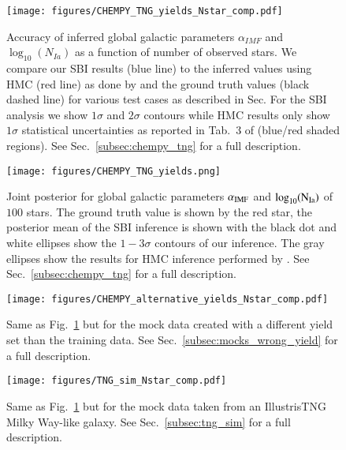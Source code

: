\documentclass{aa}
\begin{document}
\begin{figure*}
    \centering
    \texttt{[image: figures/CHEMPY\_TNG\_yields\_Nstar\_comp.pdf]}
    \vspace{-.5cm}
    \caption{Accuracy of inferred global galactic parameters $\alpha_{IMF}$ and $\log_{10}(N_{Ia})$ as a function of number of observed stars. We compare our SBI results (blue line) to the inferred values using HMC (red line) as done by \cite{Philcox_2019} and the ground truth values (black dashed line) for various test cases as described in Sec. For the SBI analysis we show $1\sigma$ and $2\sigma$ contours while HMC results only show $1\sigma$ statistical uncertainties as reported in Tab.~3 of \citet{Philcox_2019} (blue/red shaded regions). See Sec.~\ref{subsec:chempy_tng} for a full description.}
    \label{fig:CHEMPY_TNG_N_star_analysis}
\end{figure*}

\begin{figure}
    \centering
    \texttt{[image: figures/CHEMPY\_TNG\_yields.png]}
    \vspace{-.25cm}
    \caption{Joint posterior for global galactic parameters $\alpha_{\rm IMF}$ and $\log_{10}(\rm N_{Ia})$ of $100$ stars. The ground truth value is shown by the red star, the posterior mean of the SBI inference is shown with the black dot and white ellipses show the $1-3\sigma$ contours of our inference. The gray ellipses show the results for HMC inference performed by \citet{Philcox_2019}. See Sec.~\ref{subsec:chempy_tng} for a full description.}
    \label{fig:CHEMPY_TNG_sbi} 
\end{figure}
\begin{figure*}
    \centering
    \texttt{[image: figures/CHEMPY\_alternative\_yields\_Nstar\_comp.pdf]}
    \vspace{-.5cm}
    \caption{Same as Fig.~\ref{fig:CHEMPY_TNG_N_star_analysis} but for the mock data created with a different yield set than the training data. See Sec.~\ref{subsec:mocks_wrong_yield} for a full description.}
    \label{fig:CHEMPY_alt_N_star_analysis}
\end{figure*}
\begin{figure*}
    \centering
    \texttt{[image: figures/TNG\_sim\_Nstar\_comp.pdf]}
    \vspace{-.5cm}
    \caption{Same as Fig.~\ref{fig:CHEMPY_TNG_N_star_analysis} but for the mock data taken from an IllustrisTNG Milky Way-like galaxy. See Sec.~\ref{subsec:tng_sim} for a full description.}
    \label{fig:TNG_N_star_analysis}
\end{figure*}
\end{document}
